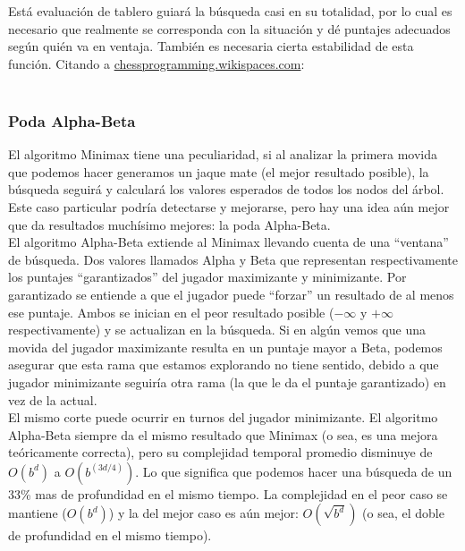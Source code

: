 \documentclass{article}
\begin{document}
Está evaluación de tablero guiará la búsqueda casi en su
totalidad, por lo cual es necesario que realmente se corresponda con
la situación y dé puntajes adecuados según quién va en ventaja.
También es necesaria cierta estabilidad de esta función. Citando a
\href{http://chessprogramming.wikispaces.com/}{chessprogramming.wikispaces.com}:
\\

\noindent
{}
\\

\subsubsection{Poda Alpha-Beta}

El algoritmo Minimax tiene una peculiaridad, si al analizar la primera
movida que podemos hacer generamos un jaque mate (el mejor resultado
posible), la búsqueda seguirá y calculará los valores esperados de
todos los nodos del árbol. Este caso particular podría detectarse y
mejorarse, pero hay una idea aún mejor que da resultados muchísimo
mejores: la poda Alpha-Beta.
\\

El algoritmo Alpha-Beta extiende al Minimax llevando cuenta de una
``ventana'' de búsqueda. Dos valores llamados Alpha y Beta que
representan respectivamente los puntajes ``garantizados'' del jugador
maximizante y minimizante. Por garantizado se entiende a que el jugador
puede ``forzar'' un resultado de al menos ese puntaje. Ambos se inician
en el peor resultado posible ($-\infty$ y $+\infty$ respectivamente)
y se actualizan en la búsqueda. Si en algún vemos que una movida
del jugador maximizante resulta en un puntaje mayor a Beta, podemos
asegurar que esta rama que estamos explorando no tiene sentido, debido
a que jugador minimizante seguiría otra rama (la que le da el puntaje
garantizado) en vez de la actual.
\\

El mismo corte puede ocurrir en turnos del jugador minimizante. El
algoritmo Alpha-Beta siempre da el mismo resultado que Minimax (o sea,
es una mejora teóricamente correcta), pero su complejidad temporal
promedio disminuye de $O(b^d)$ a $O(b^{(3d/4)})$\footnotemark. Lo
que significa que podemos hacer una búsqueda de un 33\% mas de
profundidad en el mismo tiempo. La complejidad en el peor caso se
mantiene ($O(b^d)$) y la del mejor caso es aún mejor: $O(\sqrt{b^d})$
(o sea, el doble de profundidad en el mismo tiempo).
\\
\end{document}
